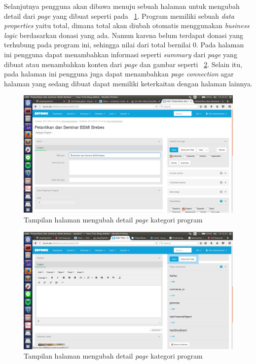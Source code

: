 Selanjutnya pengguna akan dibawa menuju sebuah halaman untuk mengubah detail dari \textit{page} yang dibuat seperti pada \pic~\ref{fig:editprogram}. Program memiliki sebuah \textit{data properties} yaitu total, dimana total akan diubah otomatis menggunakan \textit{business logic} berdasarkan donasi yang ada. Namun karena belum terdapat donasi yang terhubung pada program ini, sehingga nilai dari total bernilai 0. Pada halaman ini pengguna dapat menambahkan informasi seperti \textit{summary} dari \textit{page} yang dibuat atau menambahkan konten dari \textit{page} dan gambar seperti \pic~\ref{fig:editprogram2}. Selain itu, pada halaman ini pengguna juga dapat menambahkan \textit{page connection} agar halaman yang sedang dibuat dapat memiliki keterkaitan dengan halaman lainnya.
\begin{figure}
	\centering
	\includegraphics[width=1\textwidth]
	{pics/4-editProgram.png}
	\caption{Tampilan halaman mengubah detail \textit{page} kategori program}
	\label{fig:editprogram}
\end{figure}
\vspace{-0.3cm}

\begin{figure}
	\centering
	\includegraphics[width=1\textwidth]
	{pics/4-editProgram2.png}
	\caption{Tampilan halaman mengubah detail \textit{page} kategori program}
	\label{fig:editprogram2}
\end{figure}
\vspace{0.5cm}

